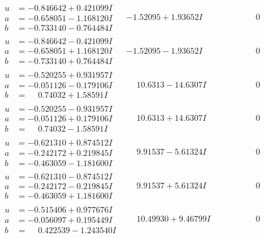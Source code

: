 \documentclass[1p]{elsarticle_modified}
\theoremstyle{definition}
\begin{document}
$$\begin{array}{c|c|c}
\begin{aligned}
u &= -0.846642 + 0.421099 I \\
a &= -0.658051 - 1.168120 I \\
b &= -0.733140 - 0.764484 I\end{aligned}
 & -1.52095 + 1.93652 I & \phantom{-0.000000 } 0 \\ \hline\begin{aligned}
u &= -0.846642 - 0.421099 I \\
a &= -0.658051 + 1.168120 I \\
b &= -0.733140 + 0.764484 I\end{aligned}
 & -1.52095 - 1.93652 I & \phantom{-0.000000 } 0 \\ \hline\begin{aligned}
u &= -0.520255 + 0.931957 I \\
a &= -0.051126 - 0.179106 I \\
b &= \phantom{-}0.74032 + 1.58591 I\end{aligned}
 & \phantom{-}10.6313 - 14.6307 I & \phantom{-0.000000 } 0 \\ \hline\begin{aligned}
u &= -0.520255 - 0.931957 I \\
a &= -0.051126 + 0.179106 I \\
b &= \phantom{-}0.74032 - 1.58591 I\end{aligned}
 & \phantom{-}10.6313 + 14.6307 I & \phantom{-0.000000 } 0 \\ \hline\begin{aligned}
u &= -0.621310 + 0.874512 I \\
a &= -0.242172 + 0.219845 I \\
b &= -0.463059 - 1.181600 I\end{aligned}
 & \phantom{-}9.91537 - 5.61324 I & \phantom{-0.000000 } 0 \\ \hline\begin{aligned}
u &= -0.621310 - 0.874512 I \\
a &= -0.242172 - 0.219845 I \\
b &= -0.463059 + 1.181600 I\end{aligned}
 & \phantom{-}9.91537 + 5.61324 I & \phantom{-0.000000 } 0 \\ \hline\begin{aligned}
u &= -0.515406 + 0.977676 I \\
a &= -0.056097 + 0.195449 I \\
b &= \phantom{-}0.422539 - 1.243540 I\end{aligned}
 & \phantom{-}10.49930 + 9.46799 I & \phantom{-0.000000 } 0 \\ \hline\begin{aligned}

\end{aligned}
\end{array}$$
\end{document}
